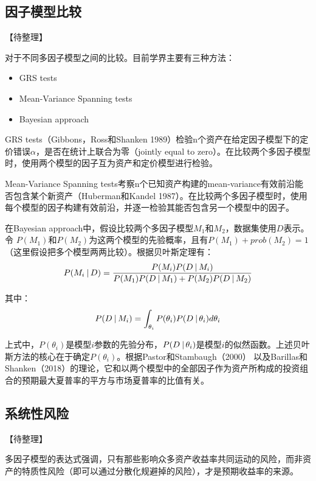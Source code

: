 \documentclass[11pt]{article}
\begin{document}
\subsection{因子模型比较}

【待整理】

对于不同多因子模型之间的比较。目前学界主要有三种方法：
\begin{itemize}
    \item GRS tests
    \item Mean-Variance Spanning tests
    \item Bayesian approach
\end{itemize}

GRS tests（Gibbons，Ross和Shanken 1989）检验n个资产在给定因子模型下的定价错误$\alpha$，是否在统计上联合为零（jointly equal to zero）。在比较两个多因子模型时，使用两个模型的因子互为资产和定价模型进行检验。

Mean-Variance Spanning tests考察n个已知资产构建的mean-variance有效前沿能否包含某个新资产（Huberman和Kandel 1987）。在比较两个多因子模型时，使用每个模型的因子构建有效前沿，并逐一检验其能否包含另一个模型中的因子。

在Bayesian approach中，假设比较两个多因子模型$M_1$和$M_2$，数据集使用$D$表示。令 $P(M_1)$和$P(M_2)$为这两个模型的先验概率，且有$P(M_1) + prob(M_2) = 1$（这里假设把多个模型两两比较）。根据贝叶斯定理有：
\begin{equation*}
    P(M_i \:\vert\, D) = \frac{P(M_i)P(D \:\vert\, M_i)}{P(M_1)P(D\:\vert\, M_1) + P(M_2)P(D\:\vert\, M_2)}
\end{equation*}

其中：
\begin{equation*}
    P(D \:\vert\, M_i) = \int_{\theta_i} P(\theta_i) P(D \:\vert\, \theta_i) d\theta_i
\end{equation*}

上式中，$P(\theta_i)$是模型$i$参数的先验分布，$P(D \:\vert\, \theta_i)$是模型$i$的似然函数。上述贝叶斯方法的核心在于确定$P(\theta_i)$。根据Pastor和Stambaugh（2000） 以及Barillas和Shanken（2018）的理论，它和以两个模型中的全部因子作为资产所构成的投资组合的预期最大夏普率的平方与市场夏普率的比值有关。

\subsection{系统性风险}

【待整理】

多因子模型的表达式强调，只有那些影响众多资产收益率共同运动的风险，而非资产的特质性风险（即可以通过分散化规避掉的风险），才是预期收益率的来源。
\end{document}
